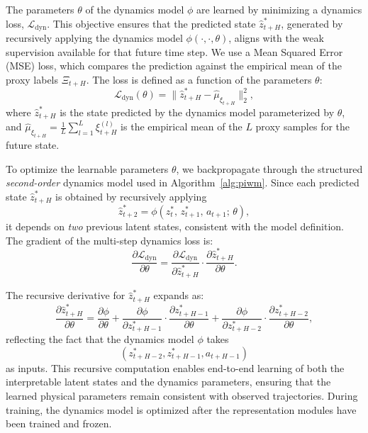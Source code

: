 \documentclass[nonacm,sigconf]{acmart}
\begin{document}
The parameters \(\theta\) of the dynamics model \(\phi\) are learned by minimizing a dynamics loss, \(\mathcal{L}_{\text{dyn}}\). This objective ensures that the predicted state \(\hat{z}^*_{t+H}\), generated by recursively applying the dynamics model \(\phi(\cdot, \cdot, \theta)\), aligns with the weak supervision available for that future time step. We use a Mean Squared Error (MSE) loss, which compares the prediction against the empirical mean of the proxy labels \(\Xi_{t+H}\). The loss is defined as a function of the parameters \(\theta\):
\begin{equation}
    \mathcal{L}_{\text{dyn}}(\theta) = \| \hat{z}^*_{t+H} -  \hat{\mu}_{\xi_{t+H}} \|_2^2,
\end{equation}
where $\hat{z}^*_{t+H}$ is the state predicted by the dynamics model parameterized by $\theta$, and $\hat{\mu}_{\xi_{t+H}} = \frac{1}{L}\sum_{l=1}^L \xi^{(l)}_{t+H}$ is the empirical mean of the $L$ proxy samples for the future state. 


To optimize the learnable parameters $\theta$, we backpropagate 
through the structured \emph{second-order} dynamics model used in Algorithm~\ref{alg:piwm}.
Since each predicted state $\hat{z}^{*}_{t+H}$ is obtained by recursively applying
\begin{equation}
\hat{z}^{*}_{t+2} = \phi(z^{*}_{t},\, z^{*}_{t+1},\, a_{t+1};\, \theta),
\end{equation}
it depends on \emph{two} previous latent states, consistent with the model definition.
The gradient of the multi-step dynamics loss is:
\begin{equation}
\frac{\partial \mathcal{L}_{\mathrm{dyn}}}{\partial \theta}
=
\frac{\partial \mathcal{L}_{\mathrm{dyn}}}{\partial \hat{z}^{*}_{t+H}}
\cdot
\frac{\partial \hat{z}^{*}_{t+H}}{\partial \theta}.
\end{equation}

The recursive derivative for $\hat{z}^{*}_{t+H}$ expands as:
\begin{equation}
\frac{\partial \hat{z}^{*}_{t+H}}{\partial \theta}
=
\frac{\partial \phi}{\partial \theta}
+
\frac{\partial \phi}{\partial z^{*}_{t+H-1}}
\cdot
\frac{\partial z^{*}_{t+H-1}}{\partial \theta}
+
\frac{\partial \phi}{\partial z^{*}_{t+H-2}}
\cdot
\frac{\partial z^{*}_{t+H-2}}{\partial \theta},
\end{equation}
reflecting the fact that the dynamics model $\phi$ takes 
$$(z^{*}_{t+H-2}, z^{*}_{t+H-1}, a_{t+H-1})$$ as inputs.
This recursive computation enables end-to-end learning of both the interpretable 
latent states and the dynamics parameters, ensuring that the learned physical 
parameters remain consistent with observed trajectories. During training, the dynamics model is optimized after the representation
modules have been trained and frozen.
\end{document}
